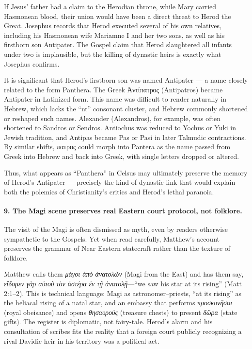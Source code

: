 If Jesus’ father had a claim to the Herodian throne, while Mary carried Hasmonean blood, their union would have been a direct threat to Herod the Great.
Josephus records that Herod executed several of his own relatives, including his Hasmonean wife Mariamne I and her two sons, as well as his firstborn son Antipater.
The Gospel claim that Herod slaughtered all infants under two is implausible, but the killing of dynastic heirs is exactly what Josephus confirms.

It is significant that Herod’s firstborn son was named Antipater — a name closely related to the form Panthera.
The Greek Ἀντίπατρος (Antipatros) became Antipater in Latinized form.
This name was difficult to render naturally in Hebrew, which lacks the “nt” consonant cluster, and Hebrew commonly shortened or reshaped such names.
Alexander (Alexandros), for example, was often shortened to Sandros or Sendros.
Antiochus was reduced to Yochus or Yuki in Jewish tradition, and Antipas became Pas or Pasi in later Talmudic contractions.
By similar shifts, πατρος could morph into Pantera as the name passed from Greek into Hebrew and back into Greek, with single letters dropped or altered.

Thus, what appears as “Panthera” in Celsus may ultimately preserve the memory of Herod’s Antipater — precisely the kind of dynastic link that would explain both the polemics of Christianity’s critics and Herod’s lethal paranoia.

\paragraph{9.
The Magi scene preserves real Eastern court protocol, not folklore.}\label{par:magi-court-protocol}

The visit of the Magi is often dismissed as myth, even by readers otherwise sympathetic to the Gospels.
Yet when read carefully, Matthew’s account preserves the grammar of Near Eastern statecraft rather than the texture of folklore.

Matthew calls them \textit{μάγοι ἀπὸ ἀνατολῶν} (Magi from the East) and has them say, \textit{εἴδομεν γὰρ αὐτοῦ τὸν ἀστέρα ἐν τῇ ἀνατολῇ}—“we saw his star at its rising” (Matt 2:1–2).
This is technical language: Magi as astronomer–priests, “at its rising” as the heliacal rising of a natal star, and an embassy that performs \textit{προσκυνῆσαι} (royal obeisance) and opens \textit{θησαυρούς} (treasure chests) to present \textit{δῶρα} (state gifts).
The register is diplomatic, not fairy-tale.
Herod’s alarm and his consultation of scribes fits the reality that a foreign court publicly recognizing a rival Davidic heir in his territory was a political act.

